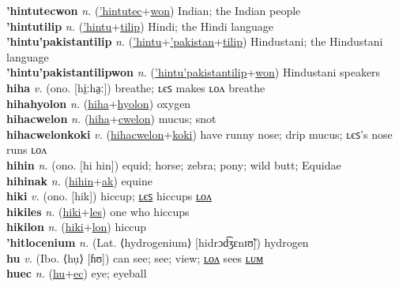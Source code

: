 \textbf{'hintutecwon} \textit{n.} (\hyperref['hintutec]{'hintutec}+\hyperref[won]{won})
Indian; the Indian people \label{'hintutecwon} \\
\textbf{'hintutilip} \textit{n.} (\hyperref['hintu]{'hintu}+\hyperref[tilip]{tilip})
Hindi; the Hindi language \label{'hintutilip} \\
\textbf{'hintu'pakistantilip} \textit{n.} (\hyperref['hintu]{'hintu}+\hyperref['pakistan]{'pakistan}+\hyperref[tilip]{tilip})
Hindustani; the Hindustani language \label{'hintu'pakistantilip} \\
\textbf{'hintu'pakistantilipwon} \textit{n.} (\hyperref['hintu'pakistantilip]{'hintu'pakistantilip}+\hyperref[won]{won})
Hindustani speakers \label{'hintu'pakistantilipwon} \\
\textbf{hiha} \textit{v.} (ono. [hi̤ːha̤ː])
breathe; ʟєꜱ makes ʟᴏᴧ breathe \label{hiha} \\
\textbf{hihahyolon} \textit{n.} (\hyperref[hiha]{hiha}+\hyperref[hyolon]{hyolon})
oxygen \label{hihahyolon} \\
\textbf{hihacwelon} \textit{n.} (\hyperref[hiha]{hiha}+\hyperref[cwelon]{cwelon})
mucus; snot \label{hihacwelon} \\
\textbf{hihacwelonkoki} \textit{v.} (\hyperref[hihacwelon]{hihacwelon}+\hyperref[koki]{koki})
have runny nose; drip mucus; ʟєꜱ’s nose runs ʟᴏᴧ \label{hihacwelonkoki} \\
\textbf{hihin} \textit{n.} (ono. [hi hin])
equid; horse; zebra; pony; wild butt; Equidae \label{hihin} \\
\textbf{hihinak} \textit{n.} (\hyperref[hihin]{hihin}+\hyperref[ak]{ak})
equine \label{hihinak} \\
\textbf{hiki} \textit{v.} (ono. [hik])
hiccup; \hyperref[hikiles]{ʟєꜱ} hiccups \hyperref[hikilon]{ʟᴏᴧ} \label{hiki} \\
\textbf{hikiles} \textit{n.} (\hyperref[hiki]{hiki}+\hyperref[les]{les})
one who hiccups \label{hikiles} \\
\textbf{hikilon} \textit{n.} (\hyperref[hiki]{hiki}+\hyperref[lon]{lon})
hiccup \label{hikilon} \\
\textbf{'hitlocenium} \textit{n.} (Lat. ⟨hydrogenium⟩ [hidrɔd͡ʒɛnɪʊ̃])
hydrogen \label{'hitlocenium} \\
\textbf{hu} \textit{v.} (Ibo. ⟨hụ⟩ [ɦʊ])
can see; see; view; \hyperref[hulon]{ʟᴏᴧ} sees \hyperref[hulum]{ʟᴜᴍ} \label{hu} \\
\textbf{huec} \textit{n.} (\hyperref[hu]{hu}+\hyperref[ec]{ec})
eye; eyeball \label{huec} \\
